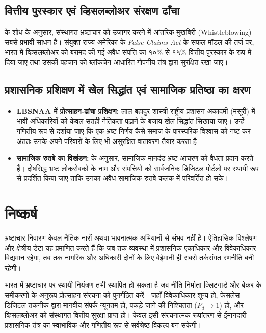 \documentclass[11pt, a4paper]{article}
\begin{document}
\subsection{वित्तीय पुरस्कार एवं व्हिसलब्लोअर संरक्षण ढाँचा}
\citep{dyck2010} के शोध के अनुसार, संस्थागत भ्रष्टाचार को उजागर करने में आंतरिक मुखबिरी (Whistleblowing) सबसे प्रभावी साधन है। संयुक्त राज्य अमेरिका के \textit{False Claims Act} के सफल मॉडल की तर्ज पर, भारत में व्हिसलब्लोअर को बरामद की गई अवैध संपत्ति का १०\% से १५\% वित्तीय पुरस्कार के रूप में दिया जाए तथा उसकी पहचान को ब्लॉकचेन-आधारित गोपनीय तंत्र द्वारा सुरक्षित रखा जाए।

\subsection{प्रशासनिक प्रशिक्षण में खेल सिद्धांत एवं सामाजिक प्रतिष्ठा का क्षरण}
\begin{itemize}
    \item \textbf{LBSNAA में प्रोत्साहन-ढांचा प्रशिक्षण:} लाल बहादुर शास्त्री राष्ट्रीय प्रशासन अकादमी (मसूरी) में भावी अधिकारियों को केवल सतही नैतिकता पढ़ाने के बजाय खेल सिद्धांत सिखाया जाए। उन्हें गणितीय रूप से दर्शाया जाए कि एक भ्रष्ट निर्णय कैसे समाज के पारस्परिक विश्वास को नष्ट कर अंततः उनके अपने परिवारों के लिए भी असुरक्षित वातावरण तैयार करता है।
    \item \textbf{सामाजिक रुतबे का विखंडन:} \citep{fisman2007} के अनुसार, सामाजिक मानदंड भ्रष्ट आचरण को वैधता प्रदान करते हैं। दोषसिद्ध भ्रष्ट लोकसेवकों के नाम और संपत्तियों को सार्वजनिक डिजिटल पोर्टलों पर स्थायी रूप से प्रदर्शित किया जाए ताकि उनका अवैध सामाजिक रुतबे कलंक में परिवर्तित हो सके।
\end{itemize}

\section{निष्कर्ष}

भ्रष्टाचार निवारण केवल नैतिक नारों अथवा भावनात्मक अभियानों से संभव नहीं है। ऐतिहासिक विश्लेषण और क्षेत्रीय डेटा यह प्रमाणित करते हैं कि जब तक व्यवस्था में प्रशासनिक एकाधिकार और विवेकाधिकार विद्यमान रहेगा, तब तक नागरिक और अधिकारी दोनों के लिए बेईमानी ही सबसे तर्कसंगत रणनीति बनी रहेगी।

भारत में भ्रष्टाचार पर स्थायी नियंत्रण तभी स्थापित हो सकता है जब नीति-निर्माता क्लिटगार्ड और बेकर के समीकरणों के अनुरूप प्रोत्साहन संरचना को पुनर्गठित करें---जहाँ विवेकाधिकार शून्य हो, फेसलेस डिजिटल तकनीक द्वारा मानवीय संपर्क न्यूनतम हो, पकड़े जाने की निश्चितता ($P_d \to 1$) हो, और व्हिसलब्लोअर को संस्थागत वित्तीय सुरक्षा प्राप्त हो। केवल इसी संरचनात्मक रूपांतरण से ईमानदारी प्रशासनिक तंत्र का स्वाभाविक और गणितीय रूप से सर्वश्रेष्ठ विकल्प बन सकेगी।
\end{document}
